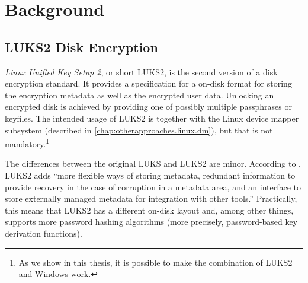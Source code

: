 \chapter{Background}
\label{chap:background}

\section{LUKS2 Disk Encryption}
\label{chap:background.luks2}
\emph{Linux Unified Key Setup 2}, or short LUKS2, is the second version of a disk encryption standard. It provides a specification \cite{Broz2018} for a on-disk format for storing the encryption metadata as well as the encrypted user data. Unlocking an encrypted disk is achieved by providing one of possibly multiple passphrases or keyfiles. The intended usage of LUKS2 is together with the Linux device mapper subsystem (described in \autoref{chap:otherapproaches.linux.dm}), but that is not mandatory.\footnote{\label{fn:luks2windows} As we show in this thesis, it is possible to make the combination of LUKS2 and Windows work.}

The differences between the original LUKS and LUKS2 are minor. According to \cite{Broz2018}, LUKS2 adds ``more flexible ways of storing metadata, redundant information to provide recovery in the case of corruption in a metadata area, and an interface to store externally managed metadata for integration with other tools.'' Practically, this means that LUKS2 has a different on-disk layout and, among other things, supports more password hashing algorithms (more precisely, password-based key derivation functions).

